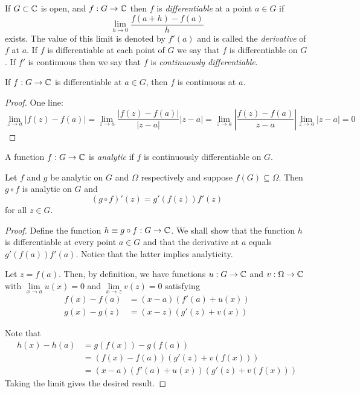 \begin{definition}
    If $G\subset\mathbb{C}$ is open, and $f: G\to\mathbb{C}$ then $f$ is \textit{differentiable} at a point $a\in G$ if 
    \begin{equation*}
        \lim_{h\to 0}\frac{f(a + h) - f(a)}{h}
    \end{equation*}
    exists. The value of this limit is denoted by $f'(a)$ and is called the \textit{derivative} of $f$ at $a$. If $f$ is differentiable at each point of $G$ we say that $f$ is differentiable on $G$. If $f'$ is continuous then we say that $f$ is \textit{continuously differentiable}.
\end{definition}

\begin{proposition}
    If $f: G\to\mathbb{C}$ is differentiable at $a\in G$, then $f$ is continuous at $a$.
\end{proposition}
\begin{proof}
    One line: 
    \begin{equation*}
        \lim_{z\to a}|f(z) - f(a)| = \lim_{z\to a}\frac{|f(z) - f(a)|}{|z - a|}|z - a| = \lim_{z\to a}\left|\frac{f(z) - f(a)}{z - a}\right|\lim_{z\to a}|z - a| = 0
    \end{equation*}
\end{proof}

\begin{definition}
    A function $f: G\to\mathbb{C}$ is \textit{analytic} if $f$ is continuously differentiable on $G$.
\end{definition}

\begin{theorem}
    Let $f$ and $g$ be analytic on $G$ and $\Omega$ respectively and suppose $f(G)\subseteq\Omega$. Then $g\circ f$ is analytic on $G$ and 
    \begin{equation*}
        (g\circ f)'(z) = g'(f(z))f'(z)
    \end{equation*}
    for all $z\in G$.
\end{theorem}
\begin{proof}
    Define the function $h\equiv g\circ f: G\to\mathbb{C}$. We shall show that the function $h$ is differentiable at every point $a\in G$ and that the derivative at $a$ equals $g'(f(a))f'(a)$. Notice that the latter implies analyticity. 

    Let $z = f(a)$. Then, by definition, we have functions $u: G\to\mathbb{C}$ and $v: \Omega\to\mathbb{C}$ with $\lim\limits_{x\to a}u(x) = 0$ and $\lim\limits_{x\to z}v(z) = 0$ satisfying 
    \begin{align*}
        f(x) - f(a) &= (x - a)(f'(a) + u(x))\\
        g(x) - g(z) &= (x - z)(g'(z) + v(x))
    \end{align*}

    Note that 
    \begin{align*}
        h(x) - h(a) &= g(f(x)) - g(f(a))\\
        &= (f(x) - f(a))(g'(z) + v(f(x)))\\
        &= (x - a)(f'(a) + u(x))(g'(z) + v(f(x)))
    \end{align*}
    Taking the limit gives the desired result.
\end{proof}

